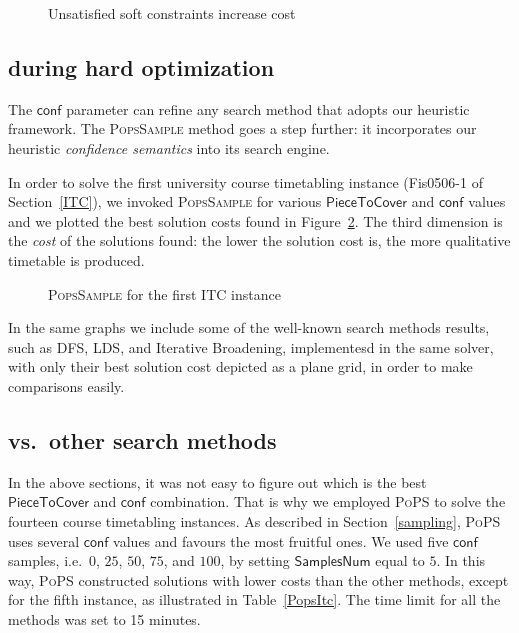 \documentclass{ws-ijait}
\begin{document}
\begin{figure}
  \centering
  
  \caption{Unsatisfied soft constraints increase
           cost\label{CELAR}}
\end{figure}

\subsection{\PopsSample{} during hard
            optimization\label{PoPS}}

The $\mathsf{conf}$ parameter can refine any search method
that adopts our heuristic framework. The \textsc{PopsSample}
method goes a step further: it incorporates our heuristic
\emph{confidence semantics} into its search engine.

In order to solve the first university course timetabling
instance (\textsf{Fis0506-1} of Section~\ref{ITC}), we
invoked \textsc{PopsSample} for various
$\mathsf{PieceToCover}$ and $\mathsf{conf}$ values and we
plotted the best solution costs found in Figure~\ref{ITC1}.
The third dimension is the \emph{cost} of the solutions
found: the lower the solution cost is, the more qualitative
timetable is produced.

\begin{figure}
  \centering
  
  \caption{{\normalfont\textsc{PopsSample}} for the first
           ITC instance\label{ITC1}}
\end{figure}

In the same graphs we include some of the well-known search
methods results, such as DFS, LDS, and Iterative Broadening,
implementesd in the same solver, with only their best
solution cost depicted as a plane grid, in order to make
comparisons easily.

\subsection{\PoPS{} vs.\ other search methods}

In the above sections, it was not easy to figure out which
is the best $\mathsf{PieceToCover}$ and $\mathsf{conf}$
combination. That is why we employed \textsc{PoPS} to solve
the fourteen course timetabling instances. As described in
Section~\ref{sampling}, \textsc{PoPS} uses several
$\mathsf{conf}$ values and favours the most fruitful ones.
We used five $\mathsf{conf}$ samples, i.e.\ $0$, $25$, $50$,
$75$, and $100$, by setting $\mathsf{SamplesNum}$ equal to
$5$. In this way, \textsc{PoPS} constructed solutions with
lower costs than the other methods, except for the fifth
instance, as illustrated in Table~\ref{PopsItc}. The time
limit for all the methods was set to 15 minutes.
\end{document}
